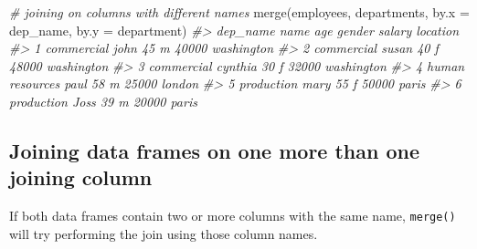 \documentclass[
]{book}
\newenvironment{Shaded}{\begin{snugshade}}{\end{snugshade}}
\newcommand{\AttributeTok}[1]{\textcolor[rgb]{0.77,0.63,0.00}{#1}}
\newcommand{\CommentTok}[1]{\textcolor[rgb]{0.56,0.35,0.01}{\textit{#1}}}
\newcommand{\FunctionTok}[1]{\textcolor[rgb]{0.00,0.00,0.00}{#1}}
\newcommand{\NormalTok}[1]{#1}
\newcommand{\StringTok}[1]{\textcolor[rgb]{0.31,0.60,0.02}{#1}}
\begin{document}
\begin{Shaded}
\begin{Highlighting}[]
\CommentTok{\# joining on columns with different names}
\FunctionTok{merge}\NormalTok{(employees, departments, }\AttributeTok{by.x =} \StringTok{\textquotesingle{}dep\_name\textquotesingle{}}\NormalTok{, }\AttributeTok{by.y =} \StringTok{\textquotesingle{}department\textquotesingle{}}\NormalTok{)}
\CommentTok{\#\textgreater{}          dep\_name    name age gender salary   location}
\CommentTok{\#\textgreater{} 1      commercial    john  45      m  40000 washington}
\CommentTok{\#\textgreater{} 2      commercial   susan  40      f  48000 washington}
\CommentTok{\#\textgreater{} 3      commercial cynthia  30      f  32000 washington}
\CommentTok{\#\textgreater{} 4 human resources    paul  58      m  25000     london}
\CommentTok{\#\textgreater{} 5      production    mary  55      f  50000      paris}
\CommentTok{\#\textgreater{} 6      production    Joss  39      m  20000      paris}
\end{Highlighting}
\end{Shaded}

\hypertarget{joining-data-frames-on-one-more-than-one-joining-column}{%
\subsection{Joining data frames on one more than one joining column}\label{joining-data-frames-on-one-more-than-one-joining-column}}

If both data frames contain two or more columns with the same name, \texttt{merge()} will try performing the join using those column names.
\end{document}
